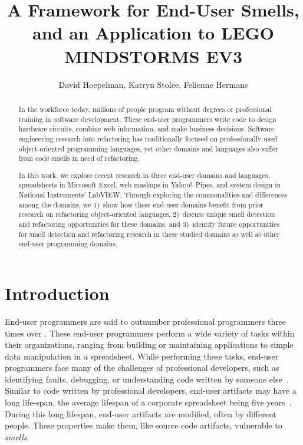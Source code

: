 \documentclass{sig-alternate}
\newcommand{\ms}{LEGO MINDSTORMS EV3}
\begin{document}
%
\title{A Framework for End-User Smells, and an Application to \ms}

\author{David Hoepelman, Katryn Stolee, Felienne Hermans}



\maketitle


\begin{abstract}
In the workforce today, millions of people program without degrees or professional training in software development. 
These end-user programmers write code to design hardware circuits, combine web information, and make business decisions. 
Software engineering research into refactoring has traditionally focused on professionally used object-oriented programming languages, 
yet other domains and languages also suffer from code smells in need of refactoring. 

In this work, we explore recent research in three end-user domains and languages, spreadsheets in Microsoft Excel, web mashups in Yahoo!\ Pipes, and system design in National Instruments' LabVIEW. 
Through exploring the commonalities and differences among the domains, we
1)~show how these end-user domains benefit from prior research on refactoring object-oriented languages,
2)~discuss unique smell detection and refactoring opportunities for these domains, and
3)~identify future opportunities for smell detection and refactoring research in these studied domains as well as other end-user programming domains. 
\end{abstract}


\section{Introduction}
End-user programmers are said to outnumber  professional programmers three times over \cite{Scaf2005}.
These end-user programmers perform a wide variety of tasks within their organizations, ranging from building or maintaining applications to simple data manipulation in a spreadsheet.
While performing these tasks, end-user programmers face many of the challenges of professional developers, such as identifying faults, debugging, or understanding code written by someone else~\cite{Ko2011}.
Similar to code written by professional developers, end-user artifacts may have a long life-span, the average lifespan of a corporate spreadsheet being five years~\cite{Hermans2011}.
During this long lifespan, end-user artifacts are modified, often by different people.
These properties make them, like source code artifacts, vulnerable to \emph{smells}. 
\end{document}
